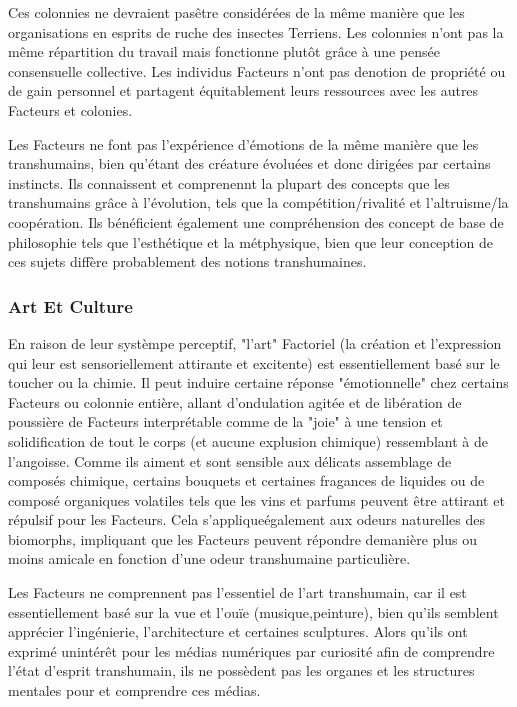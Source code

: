 Ces colonnies ne devraient pasêtre considérées de la même manière que les organisations en esprits de ruche des insectes Terriens. Les colonnies n'ont pas la même répartition du travail mais fonctionne plutôt grâce à une pensée consensuelle collective. Les individus Facteurs n'ont pas denotion de propriété ou de gain personnel et partagent équitablement leurs ressources avec les autres Facteurs et colonies. 



Les Facteurs ne font pas l'expérience d'émotions de la même manière que les transhumains, bien qu'étant des créature évoluées et donc dirigées par certains instincts. Ils connaissent et comprenennt la plupart des concepts que les transhumains grâce à l'évolution, tels que la compétition/rivalité et l'altruisme/la coopération. Ils bénéficient également une compréhension des concept de base de philosophie tels que l'esthétique et la métphysique, bien que leur conception de ces sujets diffère probablement des notions transhumaines. 

\subsubsection{Art Et Culture } 

En raison de leur systèmpe perceptif, "l'art" Factoriel (la création et l'expression qui leur est sensoriellement attirante et excitente) est essentiellement basé sur le toucher ou la chimie. Il peut induire certaine réponse "émotionnelle" chez certains Facteurs ou colonnie entière, allant d'ondulation agitée et de libération de poussière de Facteurs interprétable comme de la "joie" à une tension et solidification de tout le corps (et aucune explusion chimique) ressemblant à de l'angoisse. Comme ils aiment et sont sensible aux délicats assemblage de composés chimique, certains bouquets et certaines fragances de liquides ou de composé organiques volatiles tels que les vins et parfums peuvent être attirant et répulsif pour les Facteurs. Cela s'appliqueégalement aux odeurs naturelles des biomorphs, impliquant que les Facteurs peuvent répondre demanière plus ou moins amicale en fonction d'une odeur transhumaine particulière. 

Les Facteurs ne comprennent pas l'essentiel de l'art transhumain, car il est essentiellement basé sur la vue et l'ouïe (musique,peinture), bien qu'ils semblent apprécier l'ingénierie, l'architecture et certaines sculptures. Alors qu'ils ont exprimé unintérêt pour les médias numériques par curiosité afin de comprendre l'état d'esprit transhumain, ils ne possèdent pas les organes et les structures mentales pour et comprendre ces médias. 

